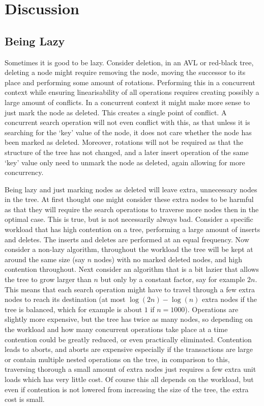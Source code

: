 \documentclass[10pt]{sigplanconf}
\begin{document}
\section{Discussion}

\subsection{Being Lazy}
Sometimes it is good to be lazy.
Consider deletion, in an AVL or red-black tree, deleting a node might require removing the node, moving the successor to its place and performing
some amount of rotations.
Performing this in a concurrent context while ensuring linearisability of all operations requires creating possibly a large amount of conflicts.
In a concurrent context it might make more sense to just mark the node as deleted.
This creates a single point of conflict.
A concurrent search operation will not even conflict with this, as that unless it is searching for the `key' value of the node, it does not care whether
the node has been marked as deleted.
Moreover, rotations will not be required as that the structure of the tree has not changed, and a later insert operation of the same `key'
value only need to unmark the node as deleted, again allowing for more concurrency.

Being lazy and just marking nodes as deleted will leave extra, unnecessary nodes in the tree.
At first thought one might consider these extra nodes to be harmful as that they will require the search operations to traverse more nodes then in the optimal case.
This is true, but is not necessarily always bad.
Consider a specific workload that has high contention on a tree, performing a large amount of inserts and deletes.
The inserts and deletes are performed at an equal frequency.
Now consider a non-lazy algorithm, throughout the workload the tree will be kept at around the same size (say $n$ nodes) with no marked deleted nodes, and high contention throughout.
Next consider an algorithm that is a bit lazier that allows the tree to grow larger than $n$ but only by a constant factor, say for example $2n$.
This means that each search operation might have to travel through a few extra nodes to reach its destination (at most $\log(2n) - \log(n)$ extra nodes if the tree is balanced,
which for example is about $1$ if $n = 1000$).
Operations are slightly more expensive, but the tree has twice as many nodes, so depending on the workload and how many concurrent operations take place at a time
contention could be greatly reduced, or even practically eliminated.
Contention leads to aborts, and aborts are expensive especially if the transactions are large or contain multiple nested operations on the tree, in comparison to this, traversing
thorough a small amount of extra nodes just requires a few extra unit loads which has very little cost.
Of course this all depends on the workload, but even if contention is not lowered from increasing the size of the tree, the extra cost is small.
\end{document}
